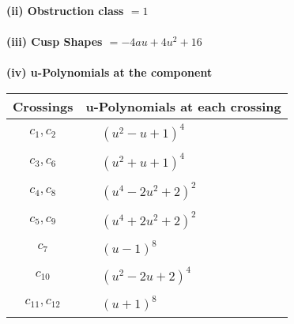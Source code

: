 \documentclass[1p]{elsarticle_modified}
\theoremstyle{definition}
\begin{document}
\flushleft \textbf{(ii) Obstruction class $= 1$}\\~\\
\flushleft \textbf{(iii) Cusp Shapes $= -4 a u+4 u^2+16$}\\~\\
\newpage\renewcommand{\arraystretch}{1}
\flushleft \textbf{(iv) u-Polynomials at the component}\newline \\
\begin{tabular}{m{50pt}|m{274pt}}
Crossings & \hspace{64pt}u-Polynomials at each crossing \\
\hline $$\begin{aligned}c_{1},c_{2}\end{aligned}$$&$\begin{aligned}
&(u^2- u+1)^4
\end{aligned}$\\
\hline $$\begin{aligned}c_{3},c_{6}\end{aligned}$$&$\begin{aligned}
&(u^2+u+1)^4
\end{aligned}$\\
\hline $$\begin{aligned}c_{4},c_{8}\end{aligned}$$&$\begin{aligned}
&(u^4-2 u^2+2)^2
\end{aligned}$\\
\hline $$\begin{aligned}c_{5},c_{9}\end{aligned}$$&$\begin{aligned}
&(u^4+2 u^2+2)^2
\end{aligned}$\\
\hline $$\begin{aligned}c_{7}\end{aligned}$$&$\begin{aligned}
&(u-1)^8
\end{aligned}$\\
\hline $$\begin{aligned}c_{10}\end{aligned}$$&$\begin{aligned}
&(u^2-2 u+2)^4
\end{aligned}$\\
\hline $$\begin{aligned}c_{11},c_{12}\end{aligned}$$&$\begin{aligned}
&(u+1)^8
\end{aligned}$\\
\hline
\end{tabular}\\~\\
\end{document}
